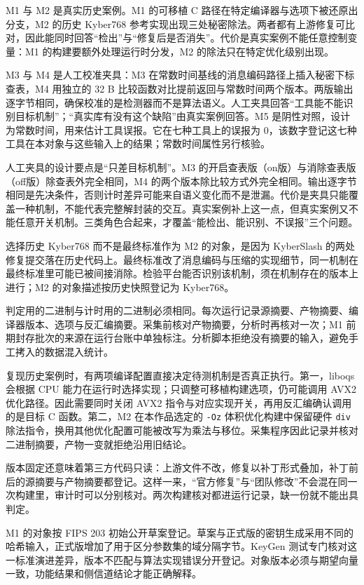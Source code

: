 M1 与 M2 是真实历史案例。M1 的可移植 C 路径在特定编译器与选项下被还原出分支，M2 的历史 Kyber768 参考实现出现三处秘密除法\cite{kyber2018}。两者都有上游修复可比对，因此能同时回答“检出”与“修复后是否消失”。代价是真实案例不能任意控制变量：M1 的构建要额外处理运行时分发，M2 的除法只在特定优化级别出现。

M3 与 M4 是人工校准夹具：M3 在常数时间基线的消息编码路径上插入秘密下标查表，M4 用独立的 32 B 比较函数对比提前返回与常数时间两个版本。两版输出逐字节相同，确保校准的是检测器而不是算法语义。人工夹具回答“工具能不能识别目标机制”；“真实库有没有这个缺陷”由真实案例回答。M5 是阴性对照，设计为常数时间，用来估计工具误报。它在七种工具上的误报为 0，该数字登记这七种工具在本对象与这些输入上的结果；常数时间属性另行核验。

人工夹具的设计要点是“只差目标机制”。M3 的开启查表版（on版）与消除查表版（off版）除查表外完全相同，M4 的两个版本除比较方式外完全相同。输出逐字节相同是先决条件，否则计时差异可能来自语义变化而不是泄漏。代价是夹具只能覆盖一种机制，不能代表完整解封装的交互。真实案例补上这一点，但真实案例又不能任意开关机制。三类角色合起来，才覆盖“能检出、能识别、不误报”三个问题。

选择历史 Kyber768 而不是最终标准作为 M2 的对象，是因为 KyberSlash 的两处修复提交落在历史代码上。最终标准改了消息编码与压缩的实现细节，同一机制在最终标准里可能已被间接消除。检验平台能否识别该机制，须在机制存在的版本上进行；M2 的对象描述按历史快照登记为 Kyber768。

判定用的二进制与计时用的二进制必须相同。每次运行记录源摘要、产物摘要、编译器版本、选项与反汇编摘要。采集前核对产物摘要，分析时再核对一次；M1 前期封存批次的来源在运行台账中单独标注。分析脚本拒绝没有摘要的输入，避免手工拷入的数据混入统计。

复现历史案例时，有两项编译配置直接决定待测机制是否真正执行。第一，liboqs 会根据 CPU 能力在运行时选择实现；只调整可移植构建选项，仍可能调用 AVX2 优化路径。因此需要同时关闭 AVX2 指令与对应实现开关，再用反汇编确认调用的是目标 C 函数。第二，M2 在本作品选定的 \texttt{-Oz} 体积优化构建中保留硬件 \texttt{div} 除法指令，换用其他优化配置可能被改写为乘法与移位。采集程序因此记录并核对二进制摘要，产物一变就拒绝沿用旧结论。

版本固定还意味着第三方代码只读：上游文件不改，修复以补丁形式叠加，补丁前后的源摘要与产物摘要都登记。这样一来，“官方修复”与“团队修改”不会混在同一次构建里，审计时可以分别核对。两次构建核对都进运行记录，缺一份就不能出具判定。

M1 的对象按 FIPS 203 初始公开草案登记。草案与正式版的密钥生成采用不同的哈希输入，正式版增加了用于区分参数集的域分隔字节。KeyGen 测试专门核对这一标准演进差异，版本不匹配与算法实现错误分开登记。对象版本必须与期望向量一致，功能结果和侧信道结论才能正确解释。

